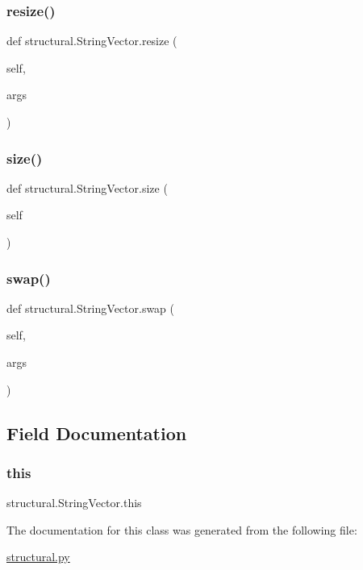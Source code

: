 \subsubsection{\texorpdfstring{resize()}{resize()}}
{\footnotesize\ttfamily def structural.\+String\+Vector.\+resize (\begin{DoxyParamCaption}\item[{}]{self,  }\item[{}]{args }\end{DoxyParamCaption})}

\mbox{\label{classstructural_1_1_string_vector_ae3042135261e0312b4f78246a3f81b7e}} 
\subsubsection{\texorpdfstring{size()}{size()}}
{\footnotesize\ttfamily def structural.\+String\+Vector.\+size (\begin{DoxyParamCaption}\item[{}]{self }\end{DoxyParamCaption})}

\mbox{\label{classstructural_1_1_string_vector_a3f83604b5610c15065d5a3bccc07c95c}} 
\subsubsection{\texorpdfstring{swap()}{swap()}}
{\footnotesize\ttfamily def structural.\+String\+Vector.\+swap (\begin{DoxyParamCaption}\item[{}]{self,  }\item[{}]{args }\end{DoxyParamCaption})}



\subsection{Field Documentation}
\mbox{\label{classstructural_1_1_string_vector_a692fb95aad03c9f9c7109481bec65c87}} 
\subsubsection{\texorpdfstring{this}{this}}
{\footnotesize\ttfamily structural.\+String\+Vector.\+this}



The documentation for this class was generated from the following file\+:\begin{DoxyCompactItemize}
\item 
\hyperlink{structural_8py}{structural.\+py}\end{DoxyCompactItemize}
